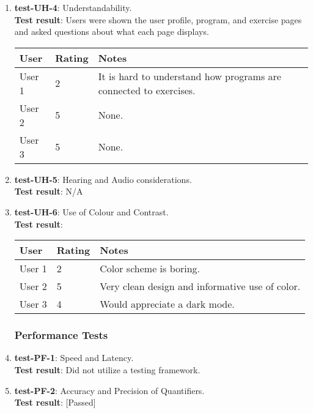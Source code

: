 \documentclass[12pt, titlepage]{article}
\begin{document}
\begin{enumerate}
	\item{\textbf{test-UH-4}}: Understandability.\\
	\textbf{Test result}:
	Users were shown the user profile, program, and exercise pages and asked questions about what each page displays.
	\begin{center}
		\begin{tabular}{ | m{3cm} | m{3cm}| m{6cm} | } 
		  \hline
		  User & Rating & Notes \\ 
		  \hline
		  User 1 & 2 & It is hard to understand how programs are connected to exercises. \\ 
		  \hline
		  User 2 & 5 & None. \\ 
		  \hline
		  User 3 & 5 & None. \\ 
		  \hline
		\end{tabular}
	\end{center}
	
	\item{\textbf{test-UH-5}}: Hearing and Audio considerations.\\
	\textbf{Test result}:
	N/A
	
	\item{\textbf{test-UH-6}}: Use of Colour and Contrast.\\
	\textbf{Test result}:
	\begin{center}
		\begin{tabular}{ | m{3cm} | m{3cm}| m{6cm} | } 
		  \hline
		  User & Rating & Notes \\ 
		  \hline
		  User 1 & 2 & Color scheme is boring. \\ 
		  \hline
		  User 2 & 5 & Very clean design and informative use of color. \\ 
		  \hline
		  User 3 & 4 & Would appreciate a dark mode.\\ 
		  \hline
		\end{tabular}
	\end{center}
	
\subsubsection{Performance Tests}
	\item{\textbf{test-PF-1}}: Speed and Latency.\\
	\textbf{Test result}: Did not utilize a testing framework.
	
	\item{\textbf{test-PF-2}}: Accuracy and Precision of Quantifiers.\\
	\textbf{Test result}: [Passed]
	

\end{enumerate}
\end{document}
